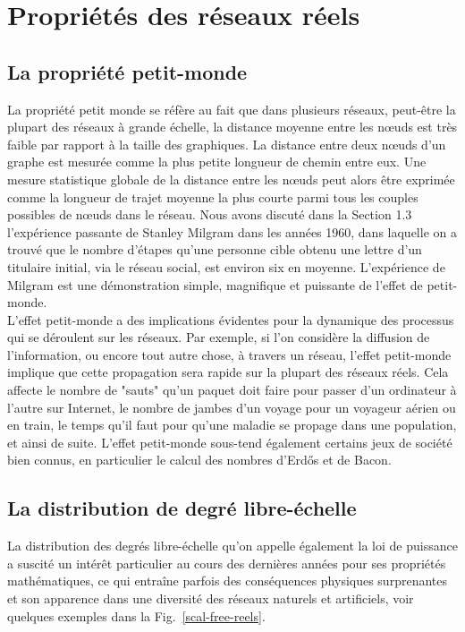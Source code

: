 \section{Propriétés des réseaux réels}
\subsection{La propriété petit-monde}
La propriété petit monde se réfère au fait que dans plusieurs réseaux, peut-être la plupart des réseaux à grande échelle, la distance moyenne entre les nœuds est très faible par rapport à la taille des graphiques. La distance entre deux nœuds d'un graphe est mesurée comme la plus petite longueur de chemin entre eux. Une mesure statistique globale de la distance entre les nœuds peut alors être exprimée comme la longueur de trajet moyenne la plus courte parmi tous les couples possibles de nœuds dans le réseau. Nous avons discuté dans la Section 1.3 l'expérience passante de Stanley Milgram dans les années 1960, dans laquelle on a trouvé que le nombre d'étapes qu'une personne cible obtenu une lettre d'un titulaire initial, via le réseau social, est environ six en moyenne. L'expérience de Milgram est une démonstration simple, magnifique et puissante de l'effet de
petit-monde.\\
L'effet petit-monde a des implications évidentes pour la dynamique des processus qui se déroulent sur les réseaux. Par exemple, si l'on considère la diffusion de l'information, ou encore tout autre chose, à travers un réseau, l'effet petit-monde implique que cette propagation sera rapide sur la plupart des réseaux réels. Cela affecte le nombre de "sauts" qu'un paquet doit faire pour passer d'un ordinateur à l'autre sur Internet, le nombre de jambes d'un voyage pour un voyageur aérien ou en train, le temps qu'il faut pour qu'une maladie se propage dans
une population, et ainsi de suite. L'effet petit-monde sous-tend également certains jeux de société bien connus, en particulier le calcul des nombres d'Erd\H{o}s \cite{RG1999} et de Bacon.

\subsection{La distribution de degré libre-échelle}
\label{s-libre-echelle}
La distribution des degrés libre-échelle qu'on appelle également la loi de puissance a suscité un intérêt particulier au cours des dernières années pour ses propriétés mathématiques, ce qui entraîne parfois des conséquences physiques surprenantes et son apparence dans une diversité des réseaux naturels et artificiels, voir quelques exemples dans la Fig.~\ref{scal-free-reels}.\\

